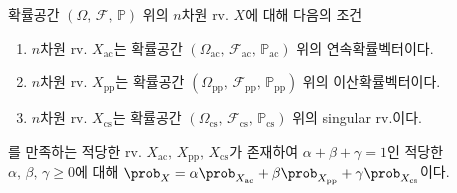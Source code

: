 \begin{theorem}
    확률공간 $(\Omega,\,\mathcal{F},\,\mathbb{P})$ 위의 $n$차원 rv. $X$에 대해 다음의 조건
    \begin{enumerate}
        \item $n$차원 rv. $X_\mathrm{ac}$는 확률공간 $(\Omega_\mathrm{ac},\,\mathcal{F}_\mathrm{ac},\,\mathbb{P}_\mathrm{ac})$ 위의 연속확률벡터이다.
        \item $n$차원 rv. $X_\mathrm{pp}$는 확률공간 $(\Omega_\mathrm{pp},\,\mathcal{F}_\mathrm{pp},\,\mathbb{P}_\mathrm{pp})$ 위의 이산확률벡터이다.
        \item $n$차원 rv. $X_\mathrm{cs}$는 확률공간 $(\Omega_\mathrm{cs},\,\mathcal{F}_\mathrm{cs},\,\mathbb{P}_\mathrm{cs})$ 위의 singular rv.이다.
    \end{enumerate}
    를 만족하는 적당한 rv. $X_\mathrm{ac},\,X_\mathrm{pp},\,X_\mathrm{cs}$가 존재하여 $\alpha+\beta+\gamma=1$인 적당한 $\alpha,\,\beta,\,\gamma\geq0$에 대해 $\prob_X=\alpha\prob_{X_\mathrm{ac}}+\beta\prob_{X_\mathrm{pp}}+\gamma\prob_{X_\mathrm{cs}}$이다.
\end{theorem}

